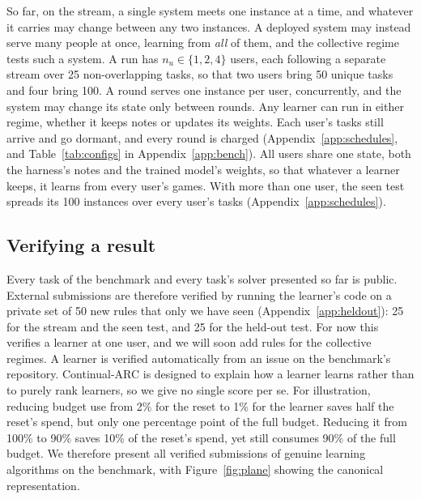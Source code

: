 So far, on the stream, a single system meets one instance at a time, and whatever it carries may change between any two instances. A deployed system may instead serve many people at once, learning from \emph{all} of them, and the collective regime tests such a system. A run has $n_u \in \{1, 2, 4\}$ users, each following a separate stream over 25 non-overlapping tasks, so that two users bring 50 unique tasks and four bring 100. A round serves one instance per user, concurrently, and the system may change its state only between rounds. Any learner can run in either regime, whether it keeps notes or updates its weights. Each user's tasks still arrive and go dormant, and every round is charged (Appendix~\ref{app:schedules}, and Table~\ref{tab:configs} in Appendix~\ref{app:bench}). All users share one state, both the harness's notes and the trained model's weights, so that whatever a learner keeps, it learns from every user's games. With more than one user, the seen test spreads its 100 instances over every user's tasks (Appendix~\ref{app:schedules}).

\subsection{Verifying a result}
\label{sec:tracks}

Every task of the benchmark and every task's solver presented so far is public. External submissions are therefore verified by running the learner's code on a private set of 50 new rules that only we have seen (Appendix~\ref{app:heldout}): 25 for the stream and the seen test, and 25 for the held-out test. For now this verifies a learner at one user, and we will soon add rules for the collective regimes. A learner is verified automatically from an issue on the benchmark's repository. Continual-ARC is designed to explain how a learner learns rather than to purely rank learners, so we give no single score per se. For illustration, reducing budget use from 2\% for the reset to 1\% for the learner saves half the reset's spend, but only one percentage point of the full budget. Reducing it from 100\% to 90\% saves 10\% of the reset's spend, yet still consumes 90\% of the full budget. We therefore present all verified submissions of genuine learning algorithms on the benchmark, with Figure~\ref{fig:plane} showing the canonical representation.
